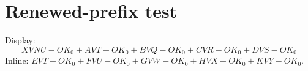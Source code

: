 \documentclass{article}
\newcommand{\xvnu}{XVNU-OK}
\newcommand{\avt}{AVT-OK}
\newcommand{\bvq}{BVQ-OK}
\newcommand{\cvr}{CVR-OK}
\newcommand{\dvs}{DVS-OK}
\newcommand{\evt}{EVT-OK}
\newcommand{\fvu}{FVU-OK}
\newcommand{\gvw}{GVW-OK}
\newcommand{\hvx}{HVX-OK}
\newcommand{\kvy}{KVY-OK}
\begin{document}
\section{Renewed-prefix test}
Display:
\[ \xvnu_0 + \avt_0 + \bvq_0 + \cvr_0 + \dvs_0 \]
Inline: $\evt_0 + \fvu_0 + \gvw_0 + \hvx_0 + \kvy_0$.
\end{document}
